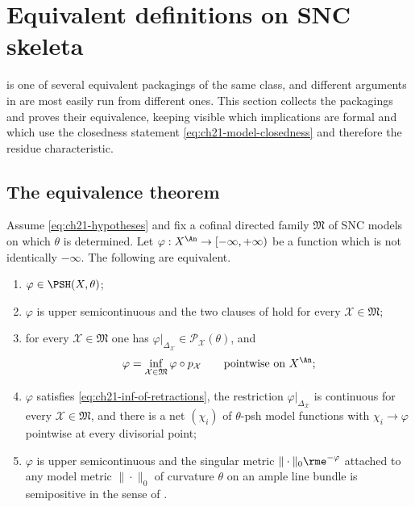 \section{Equivalent definitions on SNC skeleta}
\label{sec:ch21-equivalent}

 is one of several equivalent packagings of the same
class, and different arguments in  are most easily run from
different ones.  This section collects the packagings and proves their
equivalence, keeping visible which implications are formal and which use the
closedness statement \eqref{eq:ch21-model-closedness} and therefore the
residue characteristic.

\subsection{The equivalence theorem}
\label{sec:ch21-equivalence-theorem}

\begin{theorem}
\label{thm:ch21-equivalent}
Assume \eqref{eq:ch21-hypotheses} and fix a cofinal directed family
$\mathfrak M$ of SNC models on which $\theta$ is determined.  Let
$\varphi:X^{\An}\to[-\infty,+\infty)$ be a function which is not
identically $-\infty$.  The following are equivalent.

\begin{enumerate}
\item\label{itm:ch21-equiv:def}
$\varphi\in\PSH(X,\theta)$;
\item\label{itm:ch21-equiv:cofinal}
$\varphi$ is upper semicontinuous and the two clauses of
 hold for every $\mathcal X\in\mathfrak M$;
\item\label{itm:ch21-equiv:inf}
for every $\mathcal X\in\mathfrak M$ one has
$\varphi|_{\Delta_{\mathcal X}}\in\mathcal P_{\mathcal X}(\theta)$, and
\begin{equation}
\label{eq:ch21-inf-of-retractions}
 \varphi=\inf_{\mathcal X\in\mathfrak M}\varphi\circ p_{\mathcal X}
 \qquad\text{pointwise on }X^{\An};
\end{equation}
\item\label{itm:ch21-equiv:divisorial}
$\varphi$ satisfies \eqref{eq:ch21-inf-of-retractions}, the restriction
$\varphi|_{\Delta_{\mathcal X}}$ is continuous for every
$\mathcal X\in\mathfrak M$, and there is a net $(\chi_i)$ of
$\theta$-psh model functions with $\chi_i\to\varphi$ pointwise at every
divisorial point;
\item\label{itm:ch21-equiv:metric}
$\varphi$ is upper semicontinuous and the singular metric
$\|\cdot\|_0\rme^{-\varphi}$ attached to any model metric
$\|\cdot\|_0$ of curvature $\theta$ on an ample line bundle is
semipositive in the sense of .
\end{enumerate}
\end{theorem}

